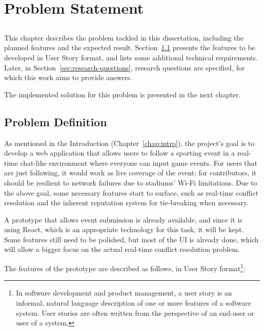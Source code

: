 \chapter{Problem Statement}\label{chap:problem}

\section*{}

This chapter describes the problem tackled in this dissertation, including the planned features and the expected result. Section~\ref{sec:prob-def} presents the features to be developed in User Story format, and lists some additional technical requirements. Later, in Section~\ref{sec:research-questions}, research questions are specified, for which this work aims to provide answers.

The implemented solution for this problem is presented in the next chapter.  

\section{Problem Definition}\label{sec:prob-def}

As mentioned in the Introduction (Chapter~\ref{chap:intro}), the project's goal is to develop a web application that allows users to follow a sporting event in a real-time chat-like environment where everyone can input game events. For users that are just following, it would work as live coverage of the event; for contributors, it should be resilient to network failures due to stadiums' Wi-Fi limitations.
Due to the above goal, some necessary features start to surface, such as real-time conflict resolution and the inherent reputation system for tie-breaking when necessary. 

A prototype that allows event submission is already available, and since it is using React, which is an appropriate technology for this task, it will be kept. Some features still need to be polished, but most of the UI is already done, which will allow a bigger focus on the actual real-time conflict resolution problem.

The features of the prototype are described as follows, in User Story format\footnote{In software development and product management, a user story is an informal, natural language description of one or more features of a software system. User stories are often written from the perspective of an end-user or user of a system.}:

